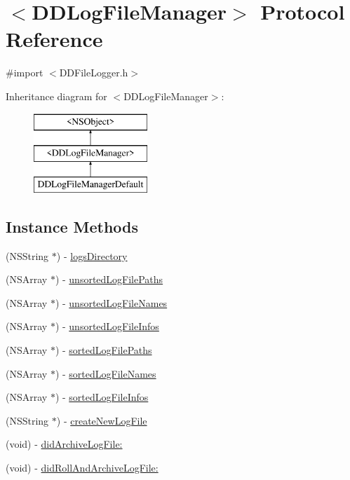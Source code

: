\hypertarget{protocol_d_d_log_file_manager-p}{\section{$<$D\-D\-Log\-File\-Manager$>$ Protocol Reference}
\label{protocol_d_d_log_file_manager-p}
}


{\ttfamily \#import $<$D\-D\-File\-Logger.\-h$>$}

Inheritance diagram for $<$D\-D\-Log\-File\-Manager$>$\-:\begin{figure}[H]
\begin{center}
\leavevmode
\includegraphics[height=3.000000cm]{protocol_d_d_log_file_manager-p}
\end{center}
\end{figure}
\subsection*{Instance Methods}
\begin{DoxyCompactItemize}
\item 
(N\-S\-String $\ast$) -\/ \hyperlink{protocol_d_d_log_file_manager-p_a1d5de02082978f3e21f95641c1d04dfc}{logs\-Directory}
\item 
(N\-S\-Array $\ast$) -\/ \hyperlink{protocol_d_d_log_file_manager-p_a63ecb0df541333c8b2ac4bdeae831213}{unsorted\-Log\-File\-Paths}
\item 
(N\-S\-Array $\ast$) -\/ \hyperlink{protocol_d_d_log_file_manager-p_a0ab5171a1c93b77f95a5c62f14e3bb81}{unsorted\-Log\-File\-Names}
\item 
(N\-S\-Array $\ast$) -\/ \hyperlink{protocol_d_d_log_file_manager-p_a30671150308cc41efc842cfb6d676c3f}{unsorted\-Log\-File\-Infos}
\item 
(N\-S\-Array $\ast$) -\/ \hyperlink{protocol_d_d_log_file_manager-p_a5c306b5749dcb2560197b82252fa602e}{sorted\-Log\-File\-Paths}
\item 
(N\-S\-Array $\ast$) -\/ \hyperlink{protocol_d_d_log_file_manager-p_acbea9ad69a93c9f90d52a3e827071b02}{sorted\-Log\-File\-Names}
\item 
(N\-S\-Array $\ast$) -\/ \hyperlink{protocol_d_d_log_file_manager-p_aa546aa0de2f32598659b0263cad191ce}{sorted\-Log\-File\-Infos}
\item 
(N\-S\-String $\ast$) -\/ \hyperlink{protocol_d_d_log_file_manager-p_a4764396987eee9020fc42502e9a469e9}{create\-New\-Log\-File}
\item 
(void) -\/ \hyperlink{protocol_d_d_log_file_manager-p_a11052c4bfb0aeb3ebf5a7eb68ba5a5f0}{did\-Archive\-Log\-File\-:}
\item 
(void) -\/ \hyperlink{protocol_d_d_log_file_manager-p_ab436eeac96a13dc2896a44a1cb2cffb1}{did\-Roll\-And\-Archive\-Log\-File\-:}
\end{DoxyCompactItemize}
